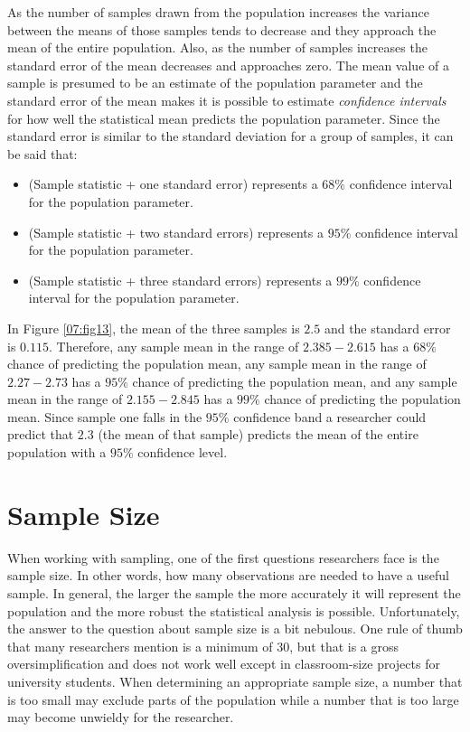 As the number of samples drawn from the population increases the variance between the means of those samples tends to decrease and they approach the mean of the entire population. Also, as the number of samples increases the standard error of the mean decreases and approaches zero. The mean value of a sample is presumed to be an estimate of the population parameter and the standard error of the mean makes it is possible to estimate \textit{confidence intervals} for how well the statistical mean predicts the population parameter. Since the standard error is similar to the standard deviation for a group of samples, it can be said that:

\begin{itemize}
	\item (Sample statistic + one standard error) represents a $ 68\% $ confidence interval for the population parameter.
	\item (Sample statistic + two standard errors) represents a $ 95\% $ confidence interval for the population parameter.
	\item (Sample statistic + three standard errors) represents a $ 99\% $ confidence interval for the population parameter.
\end{itemize}

In Figure \ref{07:fig13}, the mean of the three samples is $ 2.5 $ and the standard error is $ 0.115 $. Therefore, any sample mean in the range of $ 2.385-2.615 $ has a $ 68\% $ chance of predicting the population mean, any sample mean in the range of $ 2.27-2.73 $ has a $ 95\% $ chance of predicting the population mean, and any sample mean in the range of $ 2.155-2.845 $ has a $ 99\% $ chance of predicting the population mean. Since sample one falls in the $ 95\% $ confidence band a researcher could predict that $ 2.3 $ (the mean of that sample) predicts the mean of the entire population with a $ 95\% $ confidence level.

\section{Sample Size}

When working with sampling, one of the first questions researchers face is the sample size. In other words, how many observations are needed to have a useful sample. In general, the larger the sample the more accurately it will represent the population and the more robust the statistical analysis is possible. Unfortunately, the answer to the question about sample size is a bit nebulous. One rule of thumb that many researchers mention is a minimum of $ 30 $, but that is a gross oversimplification and does not work well except in classroom-size projects for university students. When determining an appropriate sample size, a number that is too small may exclude parts of the population while a number that is too large may become unwieldy for the researcher. 

